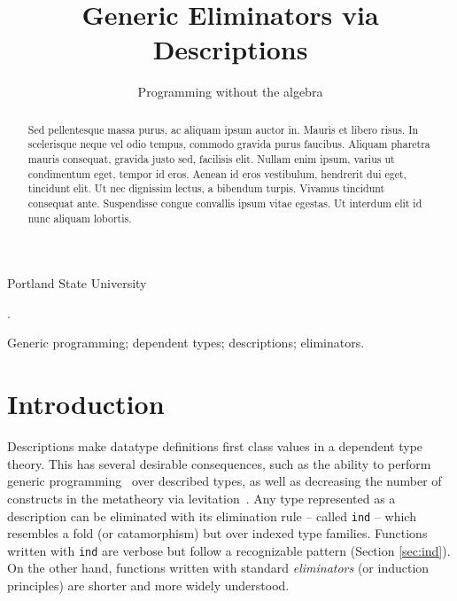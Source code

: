 \documentclass[preprint,nonatbib]{sigplanconf}
\begin{document}
\setlength{\pdfpageheight}{\paperheight}
\setlength{\pdfpagewidth}{\paperwidth}


\title{Generic Eliminators via Descriptions}
\subtitle{Programming without the algebra}

           {Portland State University}

\maketitle

\begin{abstract}
Sed pellentesque massa purus, ac aliquam ipsum auctor in. Mauris et
libero risus. In scelerisque neque vel odio tempus, commodo gravida
purus faucibus. Aliquam pharetra mauris consequat, gravida justo sed,
facilisis elit. Nullam enim ipsum, varius ut condimentum eget, tempor
id eros. Aenean id eros vestibulum, hendrerit dui eget, tincidunt
elit. Ut nec dignissim lectus, a bibendum turpis. Vivamus tincidunt
consequat ante. Suspendisse congue convallis ipsum vitae egestas. Ut
interdum elit id nunc aliquam lobortis.
\end{abstract}

.

\keywords
Generic programming; dependent types; descriptions; eliminators.

\section{Introduction}
\label{sec:intro}

Descriptions make datatype definitions first class values in a
dependent type theory. This has several desirable consequences, such as the
ability to perform generic programming~\citep{Chapman:2010:GAL:1932681.1863547,mcbride2010ornamental,dagand:phd}
over described types, as well as decreasing the number of constructs in the
metatheory via levitation~\citep{Chapman:2010:GAL:1932681.1863547,dagand:phd}. 
Any type represented as a description can
be eliminated with its elimination rule -- called {\tt ind} -- which resembles a fold (or catamorphism) but
over indexed type families. Functions written with {\tt ind} are
verbose but follow a recognizable pattern (Section \ref{sec:ind}). 
On the other hand, functions written with standard {\it eliminators} (or
induction principles) are shorter and more widely understood.
\end{document}
